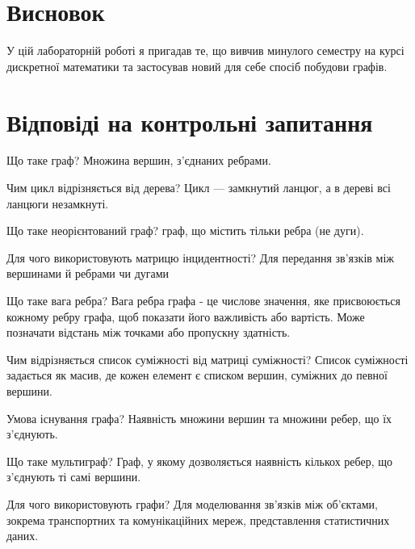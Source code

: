 \documentclass[a4paper, 12pt, oneside]{extarticle}
\begin{document}
\section*{Висновок}

У цій лабораторній роботі я пригадав те, що вивчив минулого семестру
на курсі дискретної математики та застосував новий для себе спосіб побудови графів.

\clearpage

\section*{Відповіді на контрольні запитання}
\begin{itemize}
	\question Що таке граф?
	\answer Множина вершин, з'єднаних ребрами.

	\question Чим цикл відрізняється від дерева?
	\answer Цикл --- замкнутий ланцюг, а в дереві всі ланцюги незамкнуті.

	\question Що таке неорієнтований граф?
		\answer граф, що містить тільки ребра (не дуги).

	\question Для чого використовують матрицю інцидентності?
	\answer Для передання зв'язків між вершинами й ребрами чи дугами

	\question Що таке вага ребра?
	\answer Вага ребра графа - це числове значення, яке присвоюється кожному ребру графа, щоб показати його важливість або вартість. Може позначати відстань між точками або пропускну здатність.

	\question Чим відрізняється список суміжності від матриці суміжності?
	\answer Список суміжності задається як масив, де кожен
		елемент є списком вершин, суміжних до певної вершини.

	\question Умова існування графа?
	\answer Наявність множини вершин та множини ребер,
		що їх з'єднують.

	\question Що таке мультиграф?
	\answer Граф, у якому дозволяється наявність кількох ребер, що з'єднують ті самі вершини.

	\question Для чого використовують графи?
	\answer Для моделювання зв'язків між об'єктами, зокрема
		транспортних та комунікаційних мереж, представлення
		статистичних даних.
\end{itemize}
\end{document}
